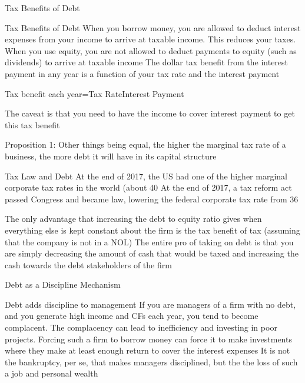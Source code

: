\documentclass[10pt]{article}
\begin{document}
    \begin{core}{Tax Benefits of Debt}

      Tax Benefits of Debt
      When you borrow money, you are allowed to deduct interest expenses from your income to arrive at taxable income. This reduces your taxes. When you use equity, you are not allowed to deduct payments to equity (such as dividends) to arrive at taxable income
      The dollar tax benefit from the interest payment in any year is a function of your tax rate and the interest payment

      Tax benefit each year=Tax RateInterest Payment

      The caveat is that you need to have the income to cover interest payment to get this tax benefit

      Proposition 1: Other things being equal, the higher the marginal tax rate of a business, the more debt it will have in its capital structure

      Tax Law and Debt
      At the end of 2017, the US had one of the higher marginal corporate tax rates in the world (about 40%
      At the end of 2017, a tax reform act passed Congress and became law, lowering the federal corporate tax rate from 36%

      The only advantage that increasing the debt to equity ratio gives when everything else is kept constant about the firm is the tax benefit of tax (assuming that the company is not in a NOL)
      The entire pro of taking on debt is that you are simply decreasing the amount of cash that would be taxed and increasing the cash towards the debt stakeholders of the firm

    \end{core}

    \begin{core}{Debt as a Discipline Mechanism}

      Debt adds discipline to management
      If you are managers of a firm with no debt, and you generate high income and CFs each year, you tend to become complacent. The complacency can lead to inefficiency and investing in poor projects. 
      Forcing such a firm to borrow money can force it to make investments where they make at least enough return to cover the interest expenses
      It is not the bankruptcy, per se, that makes managers disciplined, but the the loss of such a job and personal wealth

    \end{core}
\end{document}

